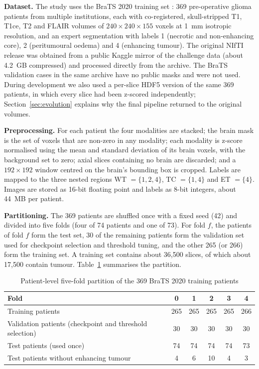 \textbf{Dataset.} The study uses the BraTS 2020 training set \cite{menze2015,bakas2017,bakas2018}: 369 pre-operative glioma patients from multiple institutions, each with co-registered, skull-stripped T1, T1ce, T2 and FLAIR volumes of $240 \times 240 \times 155$ voxels at 1~mm isotropic resolution, and an expert segmentation with labels 1 (necrotic and non-enhancing core), 2 (peritumoural oedema) and 4 (enhancing tumour). The original NIfTI release was obtained from a public Kaggle mirror of the challenge data (about 4.2~GB compressed) and processed directly from the archive. The BraTS validation cases in the same archive have no public masks and were not used. During development we also used a per-slice HDF5 version of the same 369 patients, in which every slice had been z-scored independently; Section~\ref{sec:evolution} explains why the final pipeline returned to the original volumes.

\textbf{Preprocessing.} For each patient the four modalities are stacked; the brain mask is the set of voxels that are non-zero in any modality; each modality is z-score normalised using the mean and standard deviation of its brain voxels, with the background set to zero; axial slices containing no brain are discarded; and a $192 \times 192$ window centred on the brain's bounding box is cropped. Labels are mapped to the three nested regions WT $=\{1,2,4\}$, TC $=\{1,4\}$ and ET $=\{4\}$. Images are stored as 16-bit floating point and labels as 8-bit integers, about 44~MB per patient.

\textbf{Partitioning.} The 369 patients are shuffled once with a fixed seed (42) and divided into five folds (four of 74 patients and one of 73). For fold $f$, the patients of fold $f$ form the test set, 30 of the remaining patients form the validation set used for checkpoint selection and threshold tuning, and the other 265 (or 266) form the training set. A training set contains about 36,500 slices, of which about 17,500 contain tumour. Table~\ref{tab:folds} summarises the partition.

\begin{table}[htbp]\centering\small
\caption{Patient-level five-fold partition of the 369 BraTS 2020 training patients}\label{tab:folds}
\begin{tabular}{lccccc}\toprule
\textbf{Fold} & \textbf{0} & \textbf{1} & \textbf{2} & \textbf{3} & \textbf{4}\\\midrule
Training patients & 265 & 265 & 265 & 265 & 266\\
Validation patients (checkpoint and threshold selection) & 30 & 30 & 30 & 30 & 30\\
Test patients (used once) & 74 & 74 & 74 & 74 & 73\\
Test patients without enhancing tumour & 4 & 6 & 10 & 4 & 3\\\bottomrule
\end{tabular}
\end{table}

